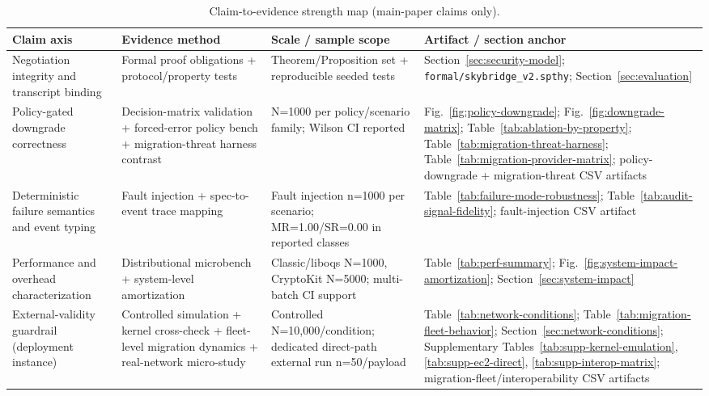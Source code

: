 \begin{table}[!t]
\centering
\scriptsize
\caption{Claim-to-evidence strength map (main-paper claims only).}
\label{tab:claim-evidence-strength}
\begin{tabular}{@{}
  >{\raggedright\arraybackslash}p{}
  >{\raggedright\arraybackslash}p{}
  >{\raggedright\arraybackslash}p{}
  >{\raggedright\arraybackslash}p{}@{}}
\toprule
Claim axis & Evidence method & Scale / sample scope & Artifact / section anchor \\
\midrule
Negotiation integrity and transcript binding & Formal proof obligations + protocol/property tests & Theorem/Proposition set + reproducible seeded tests & Section~\ref{sec:security-model}; \texttt{formal/skybridge\_v2.spthy}; Section~\ref{sec:evaluation} \\
Policy-gated downgrade correctness & Decision-matrix validation + forced-error policy bench + migration-threat harness contrast & N=1000 per policy/scenario family; Wilson CI reported & Fig.~\ref{fig:policy-downgrade}; Fig.~\ref{fig:downgrade-matrix}; Table~\ref{tab:ablation-by-property}; Table~\ref{tab:migration-threat-harness}; Table~\ref{tab:migration-provider-matrix}; policy-downgrade + migration-threat CSV artifacts \\
Deterministic failure semantics and event typing & Fault injection + spec-to-event trace mapping & Fault injection n=1000 per scenario; MR=1.00/SR=0.00 in reported classes & Table~\ref{tab:failure-mode-robustness}; Table~\ref{tab:audit-signal-fidelity}; fault-injection CSV artifact \\
Performance and overhead characterization & Distributional microbench + system-level amortization & Classic/liboqs N=1000, CryptoKit N=5000; multi-batch CI support & Table~\ref{tab:perf-summary}; Fig.~\ref{fig:system-impact-amortization}; Section~\ref{sec:system-impact} \\
External-validity guardrail (deployment instance) & Controlled simulation + kernel cross-check + fleet-level migration dynamics + real-network micro-study & Controlled N=10{,}000/condition; dedicated direct-path external run n=50/payload & Table~\ref{tab:network-conditions}; Table~\ref{tab:migration-fleet-behavior}; Section~\ref{sec:network-conditions}; Supplementary Tables~\ref{tab:supp-kernel-emulation}, \ref{tab:supp-ec2-direct}, \ref{tab:supp-interop-matrix}; migration-fleet/interoperability CSV artifacts \\
\bottomrule
\end{tabular}
\end{table}

